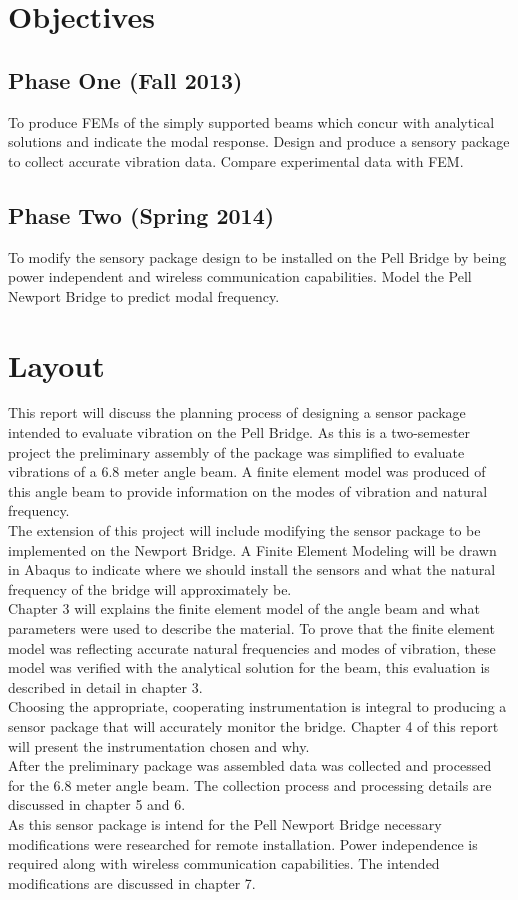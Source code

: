 \section{Objectives}
\subsection{Phase One (Fall 2013)}
\indent To produce FEMs of the simply supported beams which concur with analytical solutions and indicate the modal response. Design and produce a sensory
 package to collect accurate vibration data. Compare experimental data with FEM. \\
\subsection{Phase Two (Spring 2014)}
\indent To modify the sensory package design to be installed on the Pell Bridge by being power independent and wireless communication capabilities. Model
 the Pell Newport Bridge to predict modal frequency.\\
\section{Layout} %
This report will discuss the planning process of designing a sensor package intended to evaluate vibration on the Pell Bridge. As this is a two-semester
 project the preliminary assembly of the package was simplified to evaluate vibrations of a 6.8 meter angle beam. A finite element model was produced of
  this angle beam to provide information on the modes of vibration and natural frequency. \\
  
\indent The extension of this project will include modifying the sensor package to be implemented on the Newport Bridge. A Finite Element Modeling will be
 drawn in Abaqus to indicate where we should install the sensors and what the natural frequency of the bridge will approximately be. \\
 
\indent Chapter 3 will explains the finite element model of the angle beam and what parameters were used to describe the material. To prove that the finite
 element model was reflecting accurate natural frequencies and modes of vibration, these model was verified with the analytical solution for the beam, this
  evaluation is described in detail in chapter 3. \\
  
\indent Choosing the appropriate, cooperating instrumentation is integral to producing a sensor package that will accurately monitor the bridge. Chapter 4
 of this report will present the instrumentation chosen and why. \\
\indent After the preliminary package was assembled data was collected and processed for the 6.8 meter angle beam. The collection process and processing
 details are discussed in chapter 5 and 6. \\ 
\indent As this sensor package is intend for the Pell Newport Bridge necessary modifications were researched for remote installation. Power independence is
 required along with wireless communication capabilities. The intended modifications are discussed in chapter 7. 
